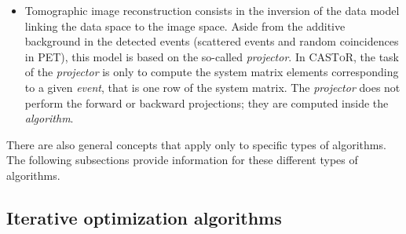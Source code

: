 \documentclass[a4paper, 11pt]{article}
\newcommand{\castor}{\textsc{CASToR}\xspace}
\begin{document}
\begin{itemize}
  \item Tomographic image reconstruction consists in the inversion of the data model linking the data space to the image space. 
        Aside from the additive background in the detected events (scattered events and random coincidences in PET), this model is based on the so-called
        \textit{projector}. 
        In \castor, the task of the \textit{projector} is only to compute the system matrix elements corresponding to a given \textit{event}, that is one
        row of the system matrix. 
        The \textit{projector} does not perform the forward or backward projections; they are computed inside the \textit{algorithm}.

\end{itemize}

There are also general concepts that apply only to specific types of algorithms. 
The following subsections provide information for these different types of algorithms.

\subsection{Iterative optimization algorithms}
\end{document}
